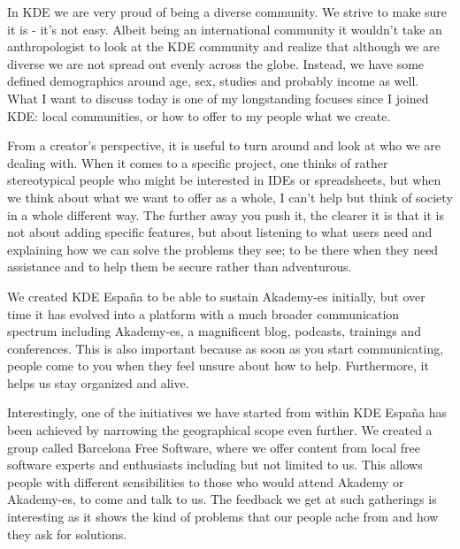 

\noindent{}In KDE we are very proud of being a diverse community. We strive to make sure it is - it's not easy. Albeit being an international community it wouldn't take an anthropologist to look at the KDE community and realize that although we are diverse we are not spread out evenly across the globe. Instead, we have some defined demographics around age, sex, studies and probably income as well. What I want to discuss today is one of my longstanding focuses since I joined KDE: local communities, or how to offer to my people what we create.

From a creator's perspective, it is useful to turn around and look at who we are dealing with. When it comes to a specific project, one thinks of rather stereotypical people who might be interested in IDEs or spreadsheets, but when we think about what we want to offer as a whole, I can't help but think of society in a whole different way. The further away you push it, the clearer it is that it is not about adding specific features, but about listening to what users need and explaining how we can solve the problems they see; to be there when they need assistance and to help them be secure rather than adventurous.

We created KDE Espa\~{n}a to be able to sustain Akademy-es initially, but over time it has evolved into a platform with a much broader communication spectrum including Akademy-es, a magnificent blog, podcasts, trainings and conferences. This is also important because as soon as you start communicating, people come to you when they feel unsure about how to help. Furthermore, it helps us stay organized and alive.

Interestingly, one of the initiatives we have started from within KDE Espa\~{n}a has been achieved by narrowing the geographical scope even further. We created a group called Barcelona Free Software, where we offer content from local free software experts and enthusiasts including but not limited to us. This allows people with different sensibilities to those who would attend Akademy or Akademy-es, to come and talk to us. The feedback we get at such gatherings is interesting as it shows the kind of problems that our people ache from and how they ask for solutions.

